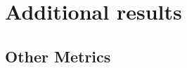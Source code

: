 \documentclass{article} %
\begin{document}







\newpage
\onecolumn
\section{Additional results}


\subsection{Other Metrics}
\label{subection:additional_results}

\end{document}
